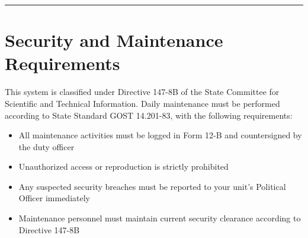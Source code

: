 \documentclass[12pt]{article}
\begin{document}
\begin{center}
\textcolor{sovietred}{\rule{0.8\textwidth}{0.4pt}}
\end{center}

\section{Security and Maintenance Requirements}
This system is classified under Directive 147-8B of the State Committee for Scientific and Technical Information. Daily maintenance must be performed according to State Standard GOST 14.201-83, with the following requirements:

\begin{itemize}
    \item All maintenance activities must be logged in Form 12-B and countersigned by the duty officer
    \item Unauthorized access or reproduction is strictly prohibited
    \item Any suspected security breaches must be reported to your unit's Political Officer immediately
    \item Maintenance personnel must maintain current security clearance according to Directive 147-8B
\end{itemize}
\end{document}

